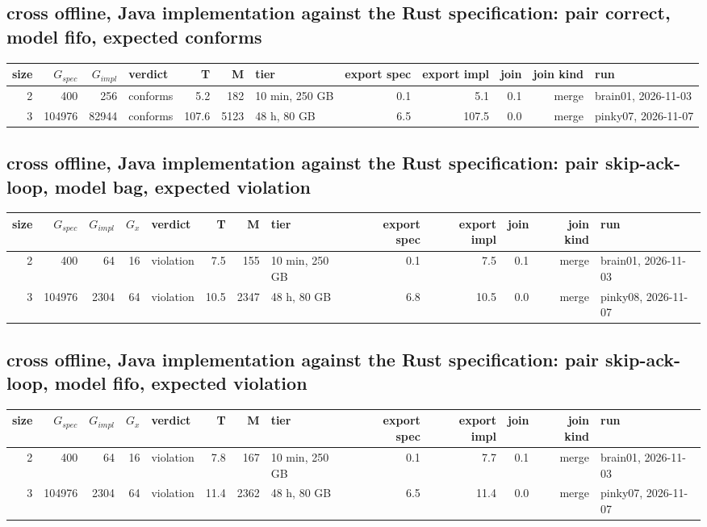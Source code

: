 \documentclass[10pt]{article}
\begin{document}
\subsection*{cross offline, Java implementation against the Rust specification: pair \textsf{correct}, model fifo, expected conforms}
\begin{longtable}{@{}rrrlrrlrrrrl@{}}
\toprule
size & $G_{\mathit{spec}}$ & $G_{\mathit{impl}}$ & verdict & T & M & tier & export spec & export impl & join & join kind & run \\
\midrule
\endhead
\color{blue} 2 & 400 & 256 & conforms & 5.2 & 182 & 10 min, 250 GB & 0.1 & 5.1 & 0.1 & merge & brain01, 2026-11-03 \\
\color{red} 3 & 104976 & 82944 & conforms & 107.6 & 5123 & 48 h, 80 GB & 6.5 & 107.5 & 0.0 & merge & pinky07, 2026-11-07 \\
\bottomrule
\end{longtable}
\subsection*{cross offline, Java implementation against the Rust specification: pair \textsf{skip-ack-loop}, model bag, expected violation}
\begin{longtable}{@{}rrrrlrrlrrrrl@{}}
\toprule
size & $G_{\mathit{spec}}$ & $G_{\mathit{impl}}$ & $G_x$ & verdict & T & M & tier & export spec & export impl & join & join kind & run \\
\midrule
\endhead
\color{blue} 2 & 400 & 64 & 16 & violation & 7.5 & 155 & 10 min, 250 GB & 0.1 & 7.5 & 0.1 & merge & brain01, 2026-11-03 \\
\color{red} 3 & 104976 & 2304 & 64 & violation & 10.5 & 2347 & 48 h, 80 GB & 6.8 & 10.5 & 0.0 & merge & pinky08, 2026-11-07 \\
\bottomrule
\end{longtable}
\subsection*{cross offline, Java implementation against the Rust specification: pair \textsf{skip-ack-loop}, model fifo, expected violation}
\begin{longtable}{@{}rrrrlrrlrrrrl@{}}
\toprule
size & $G_{\mathit{spec}}$ & $G_{\mathit{impl}}$ & $G_x$ & verdict & T & M & tier & export spec & export impl & join & join kind & run \\
\midrule
\endhead
\color{blue} 2 & 400 & 64 & 16 & violation & 7.8 & 167 & 10 min, 250 GB & 0.1 & 7.7 & 0.1 & merge & brain01, 2026-11-03 \\
\color{red} 3 & 104976 & 2304 & 64 & violation & 11.4 & 2362 & 48 h, 80 GB & 6.5 & 11.4 & 0.0 & merge & pinky07, 2026-11-07 \\
\bottomrule
\end{longtable}
\end{document}
